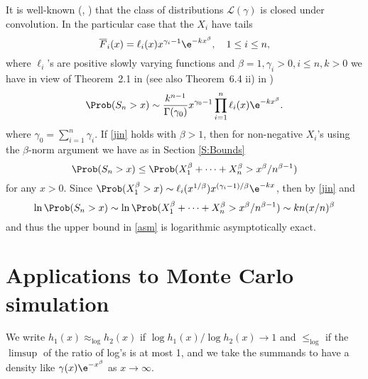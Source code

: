 	It is well-known (\cite{cline1986convolution}, \cite{watanabe2008convolution}) that the class of distributions  $\mathcal{L}(\gamma)$ is closed under convolution.  In the particular case that the $X_i$ have tails
	\begin{equation}
		\overline F_i(x) = \ell_i(x)  x^{\gamma_i-1} \e^{-k x^\beta}, \quad 1 \le i\le n,
	\end{equation}
	where $\ell_i$'s are positive slowly varying functions and $\beta=1, \gamma_i>0, i\le n,k>0$ we have in view of
	Theorem~2.1 in \cite{hashorva2014asymptotics} (see also Theorem~6.4 ii) in \cite{adler2017relative})
	\begin{equation} \label{jin}
		\Prob(S_n > x) \sim \frac{k^{n-1}}{\Gamma(\gamma_0)}
		x^{\gamma_0-1}\prod_{i=1}^n \ell_i(x) \e^{-k x^\beta }.
	\end{equation}
	where $\gamma_0=\sum_{i=1}^n \gamma_i$.
	If \eqref{jin} holds with $\beta>1$, then for non-negative $X_i$'s using the $\beta$-norm argument we have as in Section \ref{S:Bounds}
	\begin{equation} \label{asm}
	 	\Prob( S_n > x) \le \Prob( X_1^{\beta}+ \cdots +X_n^{\beta} > x^\beta /n^{\beta-1} )
	\end{equation}
	for any $x>0$. Since $\Prob( X_1^{\beta}> x) \sim \ell_i(x^{1/\beta}) x^{(\gamma_i- 1)/\beta} \e^{- k x}$, then by \eqref{jin} and 
	\[ \ln \Prob(S_n> x) \sim \ln \Prob( X_1^{\beta}+ \cdots +X_n^{\beta} > x^\beta /n^{\beta-1})  \sim  k n (x/n)^{\beta} \]
and thus the upper bound in \eqref{asm} is logarithmic asymptotically exact.

\section{Applications to Monte Carlo simulation}\label{S:CdMC}

We write $h_1(x)\approx_{\log}h_2(x)$ if $\log h_1(x)/\log h_2(x)\to 1$
and $ \le_{\log}$ if the $\limsup$ of the ratio of log's is at most 1, and we take the summands
to have a density like $\gamma(x) \e^{-x^\beta}$ as $x \to \infty$.

